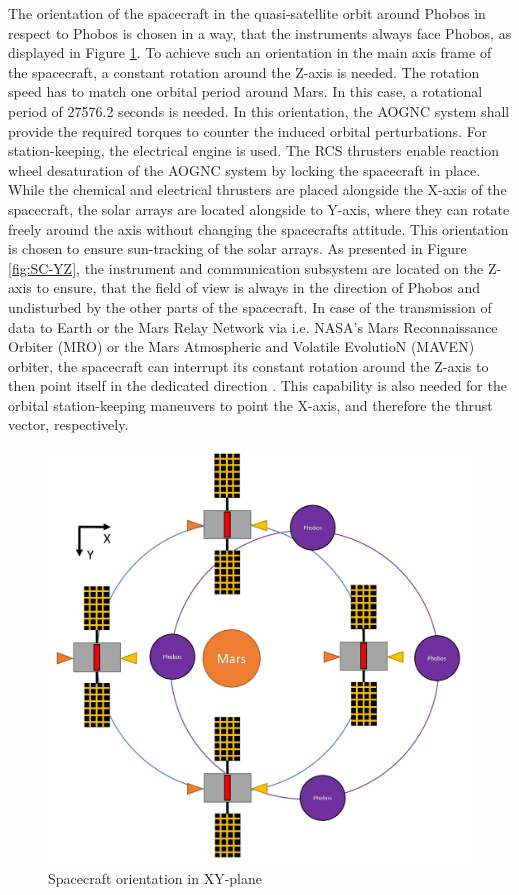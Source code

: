 \documentclass[conference]{IEEEtran}
\begin{document}
The orientation of the spacecraft in the quasi-satellite orbit around Phobos in respect to Phobos is chosen in a way, that the instruments always face Phobos, as displayed in Figure \ref{fig:SC-XY}. To achieve such an orientation in the main axis frame of the spacecraft, a constant rotation around the Z-axis is needed. The rotation speed has to match one orbital period around Mars. In this case, a rotational period of 27576.2 seconds is needed. In this orientation, the AOGNC system shall provide the required torques to counter the induced orbital perturbations. For station-keeping, the electrical engine is used. The RCS thrusters enable reaction wheel desaturation of the AOGNC system by locking the spacecraft in place. While the chemical and electrical thrusters are placed alongside the X-axis of the spacecraft, the solar arrays are located alongside to Y-axis, where they can rotate freely around the axis without changing the spacecrafts attitude. This orientation is chosen to ensure sun-tracking of the solar arrays. As presented in Figure  \ref{fig:SC-YZ}, the instrument and communication subsystem are located on the Z-axis to ensure, that the field of view is always in the direction of Phobos and undisturbed by the other parts of the spacecraft. In case of the transmission of data to Earth or the Mars Relay Network via i.e. NASA’s Mars Reconnaissance Orbiter (MRO) or the Mars Atmospheric and Volatile EvolutioN (MAVEN) orbiter, the spacecraft can interrupt its constant rotation around the Z-axis to then point itself in the dedicated direction \cite{NASA.2016}. This capability is also needed for the orbital station-keeping maneuvers to point the X-axis, and therefore the thrust vector, respectively. 

\begin{figure}[H]
  \centering  \includegraphics[width=1\linewidth]{img/Phobos XY.jpg}
  \caption{Spacecraft orientation in XY-plane}
  \label{fig:SC-XY}
\end{figure}
\end{document}
